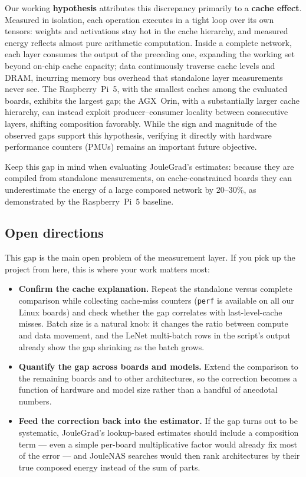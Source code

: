 Our working \textbf{hypothesis} attributes this discrepancy primarily to a \textbf{cache effect}. Measured in isolation, each operation executes in a tight loop over its own tensors: weights and activations stay hot in the cache hierarchy, and measured energy reflects almost pure arithmetic computation. Inside a complete network, each layer consumes the output of the preceding one, expanding the working set beyond on-chip cache capacity; data continuously traverse cache levels and DRAM, incurring memory bus overhead that standalone layer measurements never see. The Raspberry~Pi~5, with the smallest caches among the evaluated boards, exhibits the largest gap; the AGX~Orin, with a substantially larger cache hierarchy, can instead exploit producer--consumer locality between consecutive layers, shifting composition favorably. While the sign and magnitude of the observed gaps support this hypothesis, verifying it directly with hardware performance counters (PMUs) remains an important future objective.

Keep this gap in mind when evaluating JouleGrad's estimates: because they are compiled from standalone measurements, on cache-constrained boards they can underestimate the energy of a large composed network by $20$--$30\%$, as demonstrated by the Raspberry~Pi~5 baseline.

\subsection{Open directions}

This gap is the main open problem of the measurement layer. If you pick up
the project from here, this is where your work matters most:

\begin{itemize}
    \item \textbf{Confirm the cache explanation.} Repeat the standalone
    versus complete comparison while collecting cache-miss counters
    (\texttt{perf} is available on all our Linux boards) and check whether
    the gap correlates with last-level-cache misses. Batch size is a
    natural knob: it changes the ratio between compute and data movement,
    and the LeNet multi-batch rows in the script's output already show the
    gap shrinking as the batch grows.
    \item \textbf{Quantify the gap across boards and models.} Extend the
    comparison to the remaining boards and to other architectures, so the
    correction becomes a function of hardware and model size rather than a
    handful of anecdotal numbers.
    \item \textbf{Feed the correction back into the estimator.} If the gap
    turns out to be systematic, JouleGrad's lookup-based estimates should
    include a composition term --- even a simple per-board multiplicative
    factor would already fix most of the error --- and JouleNAS searches
    would then rank architectures by their true composed energy instead of
    the sum of parts.
\end{itemize}

